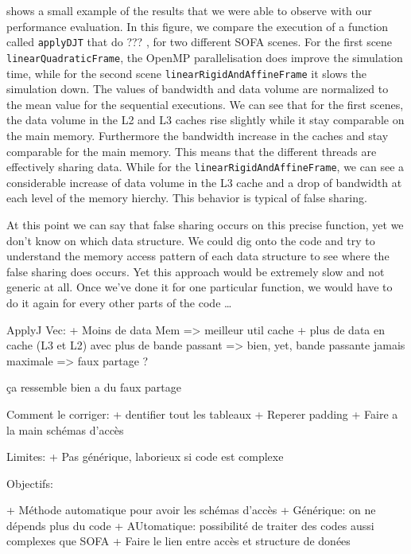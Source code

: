  shows a small example of the results that we were able to
observe with our performance evaluation. In this figure, we compare the
execution of a function called \texttt{applyDJT} that do ??? , for two different \gls{SOFA} scenes. For the first scene
\texttt{linearQuadraticFrame}, the \gls{OpenMP} parallelisation does improve
the simulation time, while for the second scene
\texttt{linearRigidAndAffineFrame} it slows the simulation down. The values of
bandwidth and data volume are normalized to the mean value for the sequential
executions. We can see that for the first scenes, the data volume in the L2
and L3 caches rise slightly while it stay comparable on the main memory.
Furthermore the bandwidth increase in the caches and stay comparable for the
main memory. This means that the different threads are effectively sharing
data. While for the \texttt{linearRigidAndAffineFrame}, we can see a
considerable increase of data volume in the L3 cache and a drop of bandwidth
at each level of the memory hierchy. This behavior is typical of false
sharing.

At this point we can say that false sharing occurs on this precise function,
yet we don't know on which data structure. We could dig onto the code and try
to understand the memory access pattern of each data structure to see where
the false sharing does occurs. Yet this approach would be extremely slow and
not generic at all. Once we've done it for one particular function, we would
have to do it again for every other parts of the code \ldots


ApplyJ Vec:
    + Moins de data Mem => meilleur util cache
    + plus de data en cache (L3 et L2) avec plus de bande passant => bien,
    yet, bande passante jamais maximale => faux partage ?

ça ressemble bien a du faux partage

Comment le corriger:
    + dentifier tout les tableaux
    + Reperer padding
    + Faire a la main schémas d'accès

Limites:
   + Pas générique, laborieux si code est complexe

Objectifs:

+ Méthode automatique pour avoir les schémas d'accès
   + Générique: on ne dépends plus du code
   + AUtomatique: possibilité de traiter des codes aussi complexes que SOFA
+ Faire le lien entre accès et structure de donées

